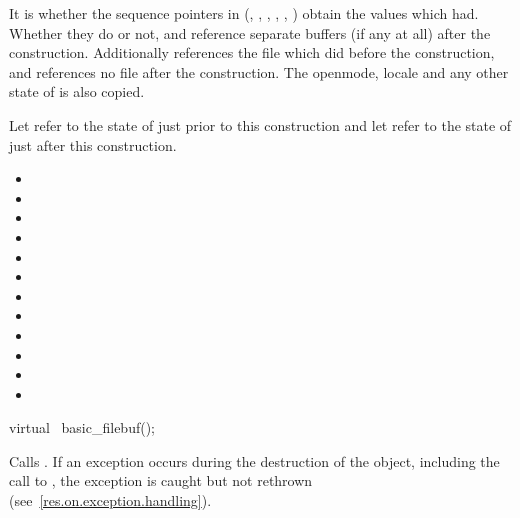 \begin{itemdescr}
\pnum
\effects
It is  whether the sequence pointers in 
(, , ,
, , ) obtain
the values which  had. Whether they do or not, 
and  reference separate buffers (if any at all) after the
construction. Additionally  references the file
which  did before the construction, and
 references no file after the construction. The
openmode, locale and any other state of  is also
copied.

\pnum
\ensures
Let  refer to the state of
 just prior to this construction and let 
refer to the state of  just after this construction.

\begin{itemize}
\item {}
\item {}
\item {}
\item {}
\item {}
\item {}
\item {}
\item {}
\item {}
\item {}
\item {}
\item {}
\end{itemize}
\end{itemdescr}

%
\begin{itemdecl}
virtual ~basic_filebuf();
\end{itemdecl}

\begin{itemdescr}
\pnum
\effects
Calls
.
If an exception occurs during the destruction of the object, including the call to , the exception is caught but not rethrown (see~\ref{res.on.exception.handling}).
\end{itemdescr}


